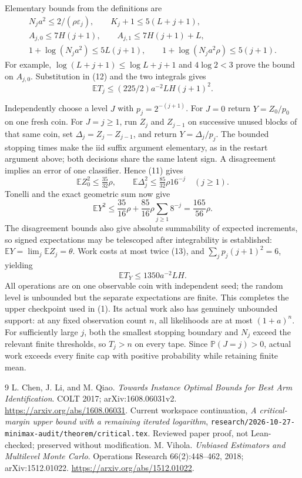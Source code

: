 \documentclass[11pt]{article}
\newcommand{\E}{\mathbb E}
\newcommand{\Pp}{\mathbb P}
\begin{document}
Elementary bounds from the definitions are
\[
\begin{gathered}
 N_ja^2\le2/(\rho\varepsilon_j),\qquad K_j+1\le5(L+j+1),\\
 A_{j,0}\le7H(j+1),\qquad A_{j,1}\le7H(j+1)+L,\\
 1+\log(N_ja^2)\le5L(j+1),\qquad
 1+\log(N_ja^2\rho)\le5(j+1).
\end{gathered}
\]
For example, $\log(L+j+1)\le\log L+j+1$ and $4\log2<3$ prove the
bound on $A_{j,0}$. Substitution in (12) and the two integrals gives
\[
 \E T_j\le(225/2)a^{-2}LH(j+1)^2.                        \tag{13}
\]

Independently choose a level $J$ with $p_j=2^{-(j+1)}$. For $J=0$ return
$Y=Z_0/p_0$ on one fresh coin. For $J=j\ge1$, run $Z_j$ and $Z_{j-1}$
on successive unused blocks of that same coin, set $\Delta_j=Z_j-Z_{j-1}$,
and return $Y=\Delta_j/p_j$. The bounded stopping times make the iid suffix
argument elementary, as in the restart argument above; both decisions share
the same latent sign. A disagreement implies an error of one classifier.
Hence (11) gives
\[
 \E Z_0^2\le\tfrac{35}{32}\rho,
 \qquad \E\Delta_j^2\le\tfrac{85}{32}\rho16^{-j}\quad(j\ge1).
\]
Tonelli and the exact geometric sum now give
\[
 \E Y^2\le\frac{35}{16}\rho+
                 \frac{85}{16}\rho\sum_{j\ge1}8^{-j}
            =\frac{165}{56}\rho.
\]
The disagreement bounds also give absolute summability of expected increments,
so signed expectations may be telescoped after integrability is established:
$\E Y=\lim_j\E Z_j=\theta$. Work costs at most twice (13), and
$\sum_jp_j(j+1)^2=6$, yielding
\[
 \E T_Y\le1350a^{-2}LH.
\]
All operations are on one observable coin with independent seed; the random
level is unbounded but the separate expectations are finite. This completes
the upper checkpoint used in (1).
Its actual work also has genuinely unbounded support: at any fixed observation
count $n$, all likelihoods are at most $(1+a)^n$. For sufficiently large $j$,
both the smallest stopping boundary and $N_j$ exceed the relevant finite
thresholds, so $T_j>n$ on every tape. Since $\Pp(J=j)>0$, actual work exceeds
every finite cap with positive probability while retaining finite mean.

\begin{thebibliography}{9}
 L. Chen, J. Li, and M. Qiao.
\emph{Towards Instance Optimal Bounds for Best Arm Identification}.
COLT 2017; arXiv:1608.06031v2.
\url{https://arxiv.org/abs/1608.06031}.
 Current workspace continuation,
\emph{A critical-margin upper bound with a remaining iterated logarithm},
\texttt{research/2026-10-27-minimax-audit/theorem/critical.tex}.
Reviewed paper proof, not Lean-checked; preserved without modification.
 M. Vihola.
\emph{Unbiased Estimators and Multilevel Monte Carlo}.
Operations Research 66(2):448--462, 2018; arXiv:1512.01022.
\url{https://arxiv.org/abs/1512.01022}.
\end{thebibliography}
\end{document}
